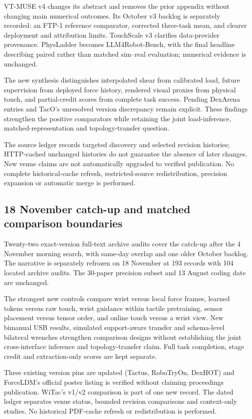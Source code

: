 VT-MUSE v4 changes its abstract and removes the prior appendix without changing
main numerical outcomes. Its October v3 backlog is separately recorded: an
FTP-1 reference comparator, corrected three-task mean, and clearer deployment
and attribution limits. TouchScale v3 clarifies data-provider provenance.
PhysLadder becomes LLM4Robot-Bench, with the final headline describing paired
rather than matched sim--real evaluation; numerical evidence is unchanged.

The new synthesis distinguishes interpolated shear from calibrated load,
future supervision from deployed force history, rendered visual proxies from
physical touch, and partial-credit scores from complete task success. Pending
DexArena entries and TacO's unresolved version discrepancy remain explicit.
These findings strengthen the positive comparators while retaining the joint
load-inference, matched-representation and topology-transfer question.

The source ledger records targeted discovery and selected revision histories;
HTTP-cached unchanged histories do not guarantee the absence of later changes.
New venue claims are not automatically upgraded to verified publication.
No complete historical-cache refresh, restricted-source redistribution,
precision expansion or automatic merge is performed.

\subsection{18 November catch-up and matched comparison boundaries}

Twenty-two exact-version full-text archive audits cover the catch-up after
the 4 November morning search, with same-day overlap and one older October
backlog. The narrative is separately refrozen on 18 November at 193
records with 104 located archive audits. The 30-paper precision subset
and 13 August coding date are unchanged.

The strongest new controls compare wrist versus local force frames, learned
tokens versus raw touch, wrist guidance within tactile pretraining, sensor
placement versus tensor order, and online touch versus a wrist view. New
bimanual USB results, simulated support-aware transfer and schema-level
bilateral wrenches strengthen comparison designs without establishing the
joint cross-interface inference and topology-transfer claim. Full task
completion, stage credit and extraction-only scores are kept separate.

Three existing version pins are updated (Tactus, RoboTryOn, DexHOT) and
ForceLDM's official poster listing is verified without claiming proceedings
publication. WiTac's v1/v2 comparison is part of one new record. The dated
ledger separates venue status, bounded revision comparisons and context-only
studies. No historical PDF-cache refresh or redistribution is performed.
